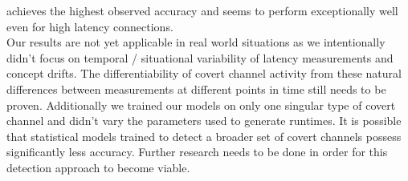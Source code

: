 \documentclass[12pt,a4paper,automark, toc=bib]{scrreprt}
\theoremstyle{definition}
\begin{document}
		achieves the highest observed accuracy and seems to perform exceptionally well even for high latency connections. \\
		Our results are not yet applicable in real world situations as we intentionally didn't focus on temporal / situational variability of latency measurements and concept drifts. The differentiability of covert channel activity from these natural differences between measurements at different points in time still needs to be proven. Additionally we trained our models on only one singular type of covert channel and didn't vary the parameters used to generate runtimes. It is possible that statistical models trained to detect a broader set of covert channels possess significantly less accuracy. Further research needs to be done in order for this detection approach to become viable.
		
\end{document}

